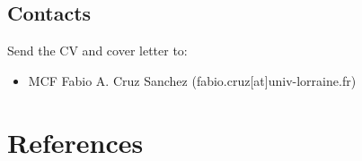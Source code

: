 \documentclass[
  12pt,
  openany]{book}
\providecommand{\tightlist}{%
  \setlength{\itemsep}{0pt}\setlength{\parskip}{0pt}}
\begin{document}
\section{Contacts}\label{contacts}

Send the CV and cover letter to:

\begin{itemize}
\tightlist
\item
  MCF Fabio A. Cruz Sanchez (fabio.cruz{[}at{]}univ-lorraine.fr)
\end{itemize}

\newpage

\chapter{References}\label{references}


\backmatter
\end{document}
